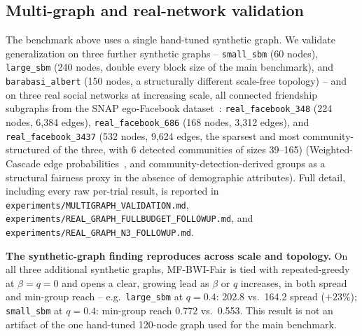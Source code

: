 \documentclass[journal]{IEEEtran}
\begin{document}
\subsection{Multi-graph and real-network validation}
\label{sec:results-multigraph}

The benchmark above uses a single hand-tuned synthetic graph. We validate
generalization on three further synthetic graphs -- \texttt{small\_sbm}
(60 nodes), \texttt{large\_sbm} (240 nodes, double every block size of the
main benchmark), and \texttt{barabasi\_albert} (150 nodes, a structurally
different scale-free topology) -- and on three real social networks at
increasing scale, all connected friendship subgraphs from the SNAP
ego-Facebook dataset~\cite{mcauley2012learning}: \texttt{real\_facebook\_348}
(224 nodes, 6{,}384 edges), \texttt{real\_facebook\_686} (168 nodes,
3{,}312 edges), and \texttt{real\_facebook\_3437} (532 nodes, 9{,}624
edges, the sparsest and most community-structured of the three, with 6
detected communities of sizes 39--165) (Weighted-Cascade edge
probabilities~\cite{chen2009efficient}, and community-detection-derived
groups as a structural fairness proxy in the absence of demographic
attributes). Full detail, including every raw per-trial result, is
reported in \texttt{experiments/MULTIGRAPH\_VALIDATION.md},
\texttt{experiments/REAL\_GRAPH\_FULLBUDGET\_FOLLOWUP.md}, and
\texttt{experiments/REAL\_GRAPH\_N3\_FOLLOWUP.md}.

\textbf{The synthetic-graph finding reproduces across scale and topology.}
On all three additional synthetic graphs, MF-BWI-Fair is tied with
repeated-greedy at $\beta=q=0$ and opens a clear, growing lead as $\beta$
or $q$ increases, in both spread and min-group reach -- e.g.\
\texttt{large\_sbm} at $q=0.4$: 202.8 vs.\ 164.2 spread ($+23\%$);
\texttt{small\_sbm} at $q=0.4$: min-group reach 0.772 vs.\ 0.553. This
result is not an artifact of the one hand-tuned 120-node graph used for
the main benchmark.
\end{document}
